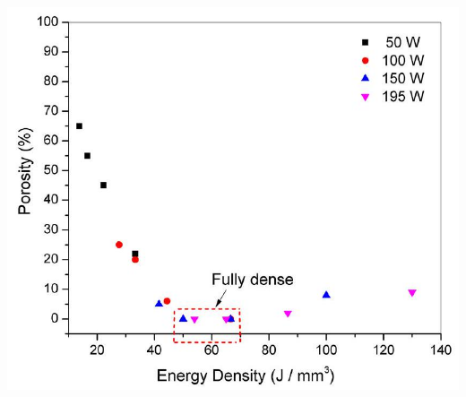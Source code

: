 \documentclass[10pt]{article}
\begin{document}
\begin{center}
\includegraphics[max width=\textwidth]{2024_02_28_5b6806184856c64a957ag-08}
\end{center}
\end{document}
